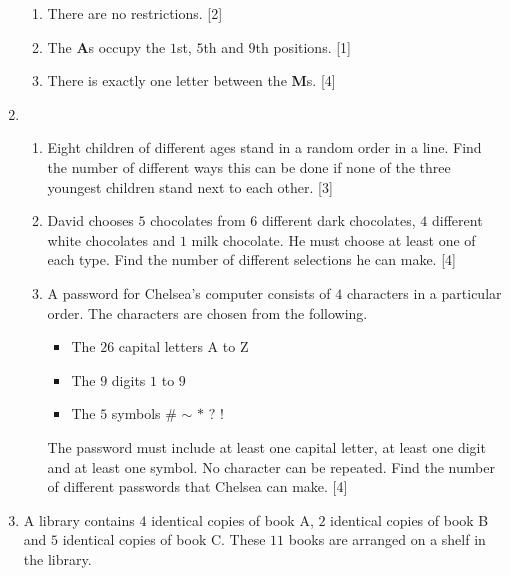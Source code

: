 \begin{enumerate}
  \begin{enumerate}
  	\item There are no restrictions. \hfill[2]
  	\item The \textbf{A}s occupy the $1$st, $5$th and $9$th positions. \hfill[1]
  	\item  There is exactly one letter between the \textbf{M}s. \hfill [4]
  \end{enumerate}
		
		
		

\item  \begin{enumerate}
	\item Eight children of different ages stand in a random order in a line. Find the number of different ways this can be done if none of the three youngest children stand next to each other. \hfill[3]
	\item David chooses $5$ chocolates from $6$ different dark chocolates, $4$ different white chocolates and $1$ milk chocolate. He must choose at least one of each type. Find the number of different selections he can make. \hfill[4]
	\item A password for Chelsea’s computer consists of $4$ characters in a particular order. The characters are chosen from the following.
	\begin{itemize}
		\setlength\itemsep{0.5em}
		\item The $26$ capital letters A to Z
		\item The $9$ digits $1$ to $9$
		\item The $5$ symbols $\#$ $\sim$  $*$  $?$  $!$
	\end{itemize} 
	The password must include at least one capital letter, at least one digit and at least one symbol.	No character can be repeated. Find the number of different passwords that Chelsea can make. \hfill 	[4]
\end{enumerate}	
		

\item A library contains $4$ identical copies of book A, $2$ identical copies of book B and $5$ identical copies of book C. These $11$ books are arranged on a shelf in the library.


\end{enumerate}
